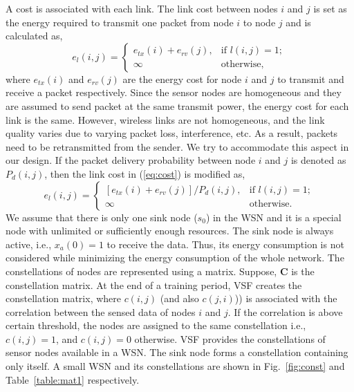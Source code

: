 \documentclass[conference]{IEEEtran}
\begin{document}
A cost is associated with each link. The link cost between nodes $i$ and $j$ is set as the energy required to transmit one packet from node $i$ to node $j$ and is calculated as, 
\newcommand{\twopartdef}[4]
{
	\left\{
		\begin{array}{ll}
			#1 & #2 \\
			#3 & #4
		\end{array}
	\right.
}
\begin{equation}
e_{l}(i,j) = \twopartdef { e_{tx}(i) + e_{rv}(j), } {\mbox{if $l(i,j)=1$};} {\infty} {\mbox{otherwise},}
\label{eq:cost}
\end{equation}
where $e_{tx}(i)$ and $e_{rv}(j)$ are the energy cost for node $i$ and $j$ to transmit and receive a packet respectively. Since the sensor nodes are homogeneous and they are assumed to send packet at the same transmit power, the energy cost for each link is the same. However, wireless links are not homogeneous, and the link quality varies due to varying packet loss, interference, etc. As a result, packets need to be retransmitted from the sender. We try to accommodate this aspect in our design. If the packet delivery probability between node $i$ and $j$ is denoted as $P_{d}(i,j)$, then the link cost in (\ref{eq:cost}) is modified as,
\begin{equation}
e_{l}(i,j) = \twopartdef {[e_{tx}(i) + e_{rv}(j)]/P_{d}(i,j), } {\mbox{if $l(i,j)=1$};} {\infty} {\mbox{otherwise}.}
\label{eq:linkcost}
\end{equation}
We assume that there is only one sink node ($s_{0}$) in the WSN and it is a special node with unlimited or sufficiently enough resources. The sink node is always active, i.e., $x_{a}(0)=1$ to receive the data. Thus, its energy consumption is not considered while minimizing the energy consumption of the whole network. The constellations of nodes are represented using a matrix. Suppose, $\boldsymbol{C}$ is the constellation matrix. At the end of a training period, VSF creates the constellation matrix, where $c(i,j)$ (and also $c(j,i)$)) is associated with the correlation between the sensed data of nodes $i$ and $j$. If the correlation is above certain threshold, the nodes are assigned to the same constellation i.e., $c(i,j)=1$, and $c(i,j)=0$ otherwise. VSF provides the constellations of sensor nodes available in a WSN. The sink node forms a constellation containing only itself. A small WSN and its constellations are shown in Fig.~\ref{fig:const} and Table~\ref{table:mat1} respectively.
\end{document}
